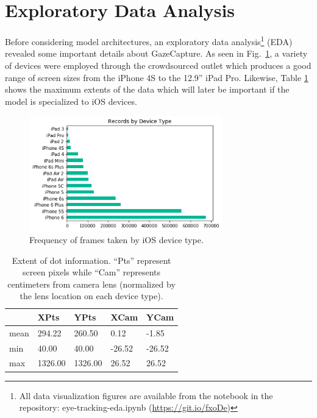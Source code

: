 \documentclass[aip, rsi, amsmath, amssymb, reprint, author-year, longbibliography]{revtex4-1}
\begin{document}
\section{\label{sec:level1}Exploratory Data Analysis}

Before considering model architectures, an exploratory data
analysis\footnote{All data visualization figures are available from the notebook
  in the repository: eye-tracking-eda.ipynb (\url{https://git.io/fxoDe})} (EDA)
revealed some important details about GazeCapture. As seen in
Fig.~\ref{fig:recordsbytype}, a variety of devices were employed through the
crowdsourced outlet which produces a good range of screen sizes from the iPhone
4S to the 12.9'' iPad Pro. Likewise, Table \ref{tab:dots} shows the maximum
extents of the data which will later be important if the model is specialized to
iOS devices.

\begin{figure}
  \includegraphics[height=5cm]{records-by-device-type.png}
\caption{\label{fig:recordsbytype} Frequency of frames taken by iOS device type.}
\end{figure}

\begin{table}[h]
\begin{ruledtabular}
\begin{tabular}{lllll}
     & XPts         & YPts         & XCam         & YCam \\ \hline
mean & 294.22       & 260.50       & 0.12         & -1.85        \\
min  & 40.00        & 40.00        & -26.52       & -26.52       \\
max  & 1326.00      & 1326.00      & 26.52        & 26.52        \\
\end{tabular}
\end{ruledtabular}
\caption{\label{tab:dots}Extent of dot information. ``Pts'' represent screen
  pixels while ``Cam'' represents centimeters from camera lens (normalized by
  the lens location on each device type).}
\end{table}
\end{document}
